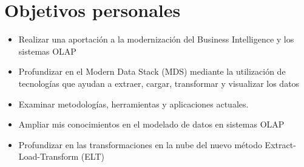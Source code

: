 \section{Objetivos personales}\label{objetivos-personales}
\begin{itemize}
    \item Realizar una aportación a la modernización del Business Intelligence y los sistemas OLAP
    \item Profundizar en el Modern Data Stack (MDS) mediante la utilización de tecnologías que ayudan a extraer, cargar, transformar y visualizar los datos
    \item Examinar metodologías, herramientas y aplicaciones actuales.
    \item Ampliar mis conocimientos en el modelado de datos en sistemas OLAP
    \item Profundizar en las transformaciones en la nube del nuevo método Extract-Load-Transform (ELT)
\end{itemize}